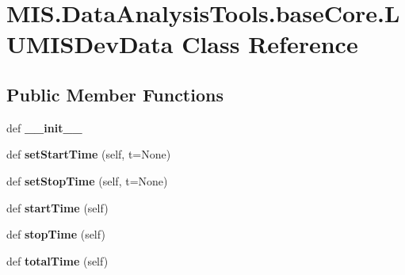 \hypertarget{classMIS_1_1DataAnalysisTools_1_1baseCore_1_1LUMISDevData}{}\section{M\+I\+S.\+Data\+Analysis\+Tools.\+base\+Core.\+L\+U\+M\+I\+S\+Dev\+Data Class Reference}
\label{classMIS_1_1DataAnalysisTools_1_1baseCore_1_1LUMISDevData}
\subsection*{Public Member Functions}
\begin{DoxyCompactItemize}
\item 
\mbox{\label{classMIS_1_1DataAnalysisTools_1_1baseCore_1_1LUMISDevData_afd2343a68d2e61ae470bba334f1f4f5a}} 
def {\bfseries \+\_\+\+\_\+init\+\_\+\+\_\+}
\item 
\mbox{\label{classMIS_1_1DataAnalysisTools_1_1baseCore_1_1LUMISDevData_a62379800f69bb7c8a95b2906a3ae3232}} 
def {\bfseries set\+Start\+Time} (self, t=None)
\item 
\mbox{\label{classMIS_1_1DataAnalysisTools_1_1baseCore_1_1LUMISDevData_a063ce15e616f6a7d6592d68a9804e3b7}} 
def {\bfseries set\+Stop\+Time} (self, t=None)
\item 
\mbox{\label{classMIS_1_1DataAnalysisTools_1_1baseCore_1_1LUMISDevData_ad107fd09bc9c01e1be0b995d961687cf}} 
def {\bfseries start\+Time} (self)
\item 
\mbox{\label{classMIS_1_1DataAnalysisTools_1_1baseCore_1_1LUMISDevData_aa934fb9c4b142fabe99f184d93116e0d}} 
def {\bfseries stop\+Time} (self)
\item 
\mbox{\label{classMIS_1_1DataAnalysisTools_1_1baseCore_1_1LUMISDevData_a79ceb08b1b3e7f4d0b88af312374420b}} 
def {\bfseries total\+Time} (self)

\end{DoxyCompactItemize}
